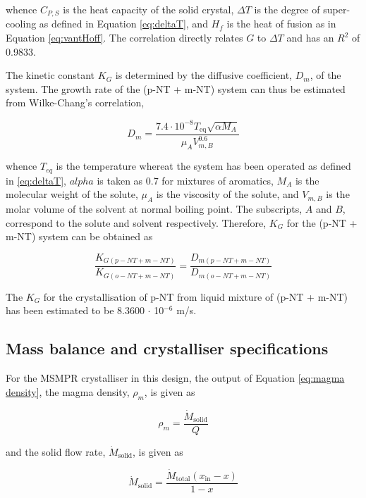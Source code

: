 \noindent whence $C_{P,S}$ is the heat capacity of the solid crystal, $\Delta T$ is the degree of super-cooling as defined in Equation \ref{eq:deltaT}, and $H_{f}$ is the heat of fusion as in Equation \ref{eq:vantHoff}. The correlation directly relates $G$ to $\Delta T$ and has an $R^2$ of 0.9833.

The kinetic constant $K_G$ is determined by the diffusive coefficient, $D_m$, of the system. The growth rate of the (p-NT + m-NT) system can thus be estimated from Wilke-Chang's correlation, \cite{miyabe_estimation_2011}

\begin{equation}
    D_m = \frac{7.4 \cdot 10^{-8} T_{\mathrm{eq}} \sqrt{\alpha M_A}}{\mu_A V_{m,B}^0.6}
\end{equation}

\noindent whence $T_{eq}$ is the temperature whereat the system has been operated as defined in \ref{eq:deltaT}, $alpha$ is taken as 0.7 for mixtures of aromatics, $M_A$ is the molecular weight of the solute, $\mu_A$ is the viscosity of the solute, and $V_{m,B}$ is the molar volume of the solvent at normal boiling point. The subscripts, $A$ and $B$, correspond to the solute and solvent respectively. Therefore, $K_G$ for the (p-NT + m-NT) system can be obtained as 

\begin{equation} \label{eq:ratio of growth kinetics}
    \frac{K_{G(p-NT + m-NT)}}{K_{G(o-NT + m-NT)}} = \frac{D_{m(p-NT + m-NT)}}{D_{m(o-NT + m-NT)}}
\end{equation}

\noindent The $K_G$ for the crystallisation of p-NT from liquid mixture of (p-NT + m-NT) has been estimated to be 8.3600 $\cdot$ 10$^{-6}$ m/s. 

\subsection{Mass balance and crystalliser specifications}

For the MSMPR crystalliser in this design, the output of Equation \ref{eq:magma density}, the magma density, $\rho_m$, is given as 

\begin{equation}
    \rho_m = \frac{\dot{M}_{\mathrm{solid}}}{Q}
\end{equation}

\noindent and the solid flow rate, $\dot{M}_{\mathrm{solid}}$, is given as

\begin{equation}
    \dot{M}_{\mathrm{solid}} = \frac{\dot{M}_{\mathrm{total}} (x_{\mathrm{in}} - x)}{1 - x}
\end{equation}


